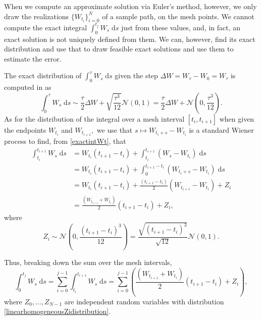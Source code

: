 \documentclass[reqno,12pt]{amsart}
\theoremstyle{plain} %
\theoremstyle{definition} %
\begin{document}
When we compute an approximate solution via Euler's method, however, we only draw the realizations $\{W_{t_i}\}_{i=0}^N$ of a sample path, on the mesh points. We cannot compute the exact integral $\int_0^{t_j} W_s\;\mathrm{d}s$ just from these values, and, in fact, an exact solution is not uniquely defined from them. We can, however, find its exact distribution and use that to draw feasible exact solutions and use them to estimate the error.

The exact distribution of $\int_0^\tau W_s\;\mathrm{d}s$ given the step $\Delta W = W_\tau - W_0 = W_\tau$ is computed in \cite[Section 14.2]{HanKloeden2017} as
\begin{equation}
    \label{exactintWt}
    \int_0^{\tau} W_s\;\mathrm{d}s \sim \frac{\tau}{2}\Delta W + \sqrt{\frac{\tau^3}{12}}\mathcal{N}(0, 1) = \frac{\tau}{2}\Delta W + \mathcal{N}\left(0, \frac{\tau^3}{12}\right).
\end{equation}
As for the distribution of the integral over a mesh interval $[t_i, t_{i+1}]$ when given the endpoints $W_{t_i}$ and $W_{t_{i+1}},$ we use that $s \mapsto W_{t_i+s} - W_{t_i}$ is a standard Wiener process to find, from \cref{exactintWt}, that
\begin{align*}
    \int_{t_i}^{t_{i+1}} W_s\;\mathrm{d}s & = W_{t_i}(t_{i+1} - t_i) + \int_{t_i}^{t_{i+1}} (W_s - W_{t_i})\;\mathrm{d}s \\
    & = W_{t_i}(t_{i+1} - t_i) + \int_{0}^{t_{i+1} - t_i} (W_{t_i+s} - W_{t_i})\;\mathrm{d}s \\
    & = W_{t_i}(t_{i+1} - t_i) + \frac{(t_{i+1} - t_i)}{2}(W_{t_{i+1}}-W_{t_{i}}) + Z_i \\
    & = \frac{(W_{t_{i+1}}+W_{t_{i}})}{2}(t_{i+1} - t_i) + Z_i,
\end{align*}
where
\begin{equation}
    \label{linearhomogeneousZidistribution}
    Z_i \sim \mathcal{N}\left(0, \frac{(t_{i+1}- t_i)^3}{12}\right) = \frac{\sqrt{(t_{i+1} - t_i)^3}}{\sqrt{12}}\mathcal{N}(0, 1).
\end{equation}

Thus, breaking down the sum over the mesh intervals,
\begin{equation}
    \label{exactintW}
    \int_0^{t_j} W_s\;\mathrm{d}s = \sum_{i = 0}^{j-1} \int_{t_i}^{t_{i+1}} W_s\;\mathrm{d}s = \sum_{i=0}^{j-1} \left( \frac{(W_{t_{i+1}}+W_{t_{i}})}{2}(t_{i+1} - t_i) + Z_i\right),
\end{equation}
where $Z_0, \ldots, Z_{N-1}$ are independent random variables with distribution \cref{linearhomogeneousZidistribution}.
\end{document}
